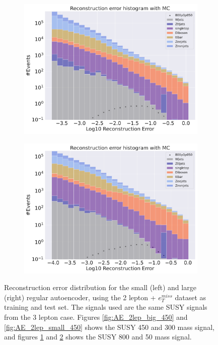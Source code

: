 \begin{figure}
\begin{subfigure}{.45\textwidth}
        \includegraphics[width=\textwidth]{Figures/AE_testing/big/2lep/b_data_recon_big_rm3_feats_sig_800p0p050_.pdf}
        \caption{}
        \label{fig:AE_2lep_big_800}
    \end{subfigure}
    \hfill   
    \begin{subfigure}{.45\textwidth}
        \includegraphics[width=\textwidth]{Figures/AE_testing/small/2lep/b_data_recon_big_rm3_feats_sig_800p0p050_.pdf}
        \caption{}
        \label{fig:AE_2lep_small_800}
    \end{subfigure}
    \hfill      
    \caption[2lep reconstruction error with SUSY signals]{Reconstruction error distribution for the small (left) and large (right)
    regular autoencoder, using the 2 lepton + $e_T^{miss}$ dataset as training and test set. The signals used are the same SUSY signals 
    from the 3 lepton case. Figures \ref{fig:AE_2lep_big_450} and \ref{fig:AE_2lep_small_450} shows the SUSY 450 and 300 mass signal, 
    and figures \ref{fig:AE_2lep_big_800} and \ref{fig:AE_2lep_small_800} shows the SUSY 800 and 50 mass signal.}
    \label{fig:AE_2lep_recon_err_both_sig}
\end{figure}

